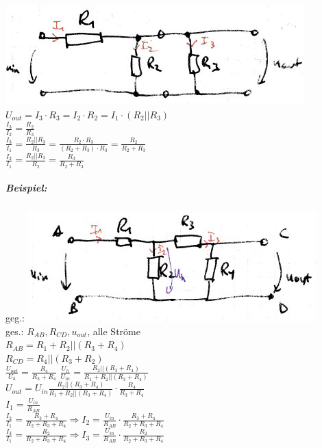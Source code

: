 \includegraphics[scale=1.5]{Abbildungen/ABB302}\\
$U_{out}=I_3 \cdot R_3 = I_2 \cdot R_2 = I_1 \cdot (R_2||R_3)$\\
$\frac{I_3}{I_2}=\frac{R_2}{R_3}$\\
$\frac{I_3}{I_1}=\frac{R_2||R_3}{R_3}=\frac{R_2 \cdot R_3}{(R_2+R_3)\cdot R_3}=\frac{R_2}{R_2+R_3}$\\
$\frac{I_2}{I_1}=\frac{R_2||R_3}{R_2}=\frac{R_3}{R_2+R_3}$

\subparagraph{Beispiel:}
geg.: \includegraphics[scale=1.5]{Abbildungen/ABB303}\\
ges.: $R_{AB}, R_{CD}, u_{out}$, alle Ströme\medskip\\
$R_{AB}=R_1+R_2||(R_3+R_4)$\\
$R_{CD}=R_4||(R_3+R_2)$\\
$\frac{U_{out}}{U_{h}}=\frac{R_4}{R_3+R_4}$
$\frac{U_h}{U_{in}}=\frac{R_2||(R_3+R_4)}{R_1+R_2||(R_3+R_4)}$\\
$U_{out}=U_{in}\frac{R_2||(R_3+R_4)}{R_1+R_2||(R_3+R_4)}\cdot\frac{R_4}{R_3+R_4}$\\
$I_1=\frac{U_{in}}{R_{AB}}$\\
$\frac{I_2}{I_1}=\frac{R_3+R_4}{R_2+R_3+R_4} \Rightarrow I_2=\frac{U_{in}}{R_{AB}}\cdot \frac{R_3+R_4}{R_2+R_3+R_4}$\\
$\frac{I_3}{I_1}=\frac{R_2}{R_2+R_3+R_4}\Rightarrow I_3 = \frac{U_{in}}{R_{AB}}\cdot \frac{R_2}{R_2+R_3+R_4}$

